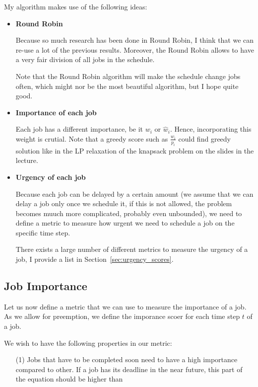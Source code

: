 My algorithm makes use of the following ideas:
\begin{itemize}
    \item \textbf{Round Robin}
    
        Because so much research has been done in Round Robin, I think that we can re-use a lot of the previous results. Moreover, the Round Robin allows to have a very fair division of all jobs in the schedule.

        Note that the Round Robin algorithm will make the schedule change jobs often, which might nor be the most beautiful algorithm, but I hope quite good.

    \item \textbf{Importance of each job}
    
        Each job has a different importance, be it $w_i$ or $\hat{w}_i$. Hence, incorporating this weight is crutial. Note that a greedy score such as $\frac{w_i}{p_i}$ could find greedy solution like in the LP relaxation of the knapsack problem on the slides in the lecture.

    \item \textbf{Urgency of each job}

        Because each job can be delayed by a certain amount (we assume that we can delay a job only once we schedule it, if this is not allowed, the problem becomes muuch more complicated, probably even unbounded), we need to define a metric to measure how urgent we need to schedule a job on the specific time step.

        There exists a large number of different metrics to measure the urgency of a job, I provide a list in Section~\ref{sec:urgency_scores}.
        

\end{itemize}

\subsection{Job Importance}


Let us now define a metric that we can use to measure the importance of a job. As we allow for preemption, we define the imporance scoer for each time step $t$ of a job. 

We wish to have the following properties in our metric:
\begin{itemize}

    \item[(1)] Jobs that have to be completed soon need to have a high importance compared to other. 
    If a job has its deadline in the near future, this part of the equation should be higher than 

\end{itemize}

